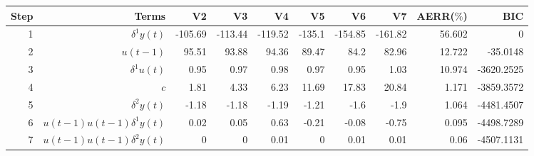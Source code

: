 \begin{tabular}{rrrrrrrrrr}
Step & Terms & V2 & V3 & V4 & V5 & V6 & V7 & AERR($\%$) & BIC \\ 
\hline 
1 & $\delta^1 y(t)$ & -105.69 & -113.44 & -119.52 & -135.1 & -154.85 & -161.82 & 56.602 & 0 \\ 
2 & $u(t-1)$ & 95.51 & 93.88 & 94.36 & 89.47 & 84.2 & 82.96 & 12.722 & -35.0148 \\ 
3 & $\delta^1 u(t)$ & 0.95 & 0.97 & 0.98 & 0.97 & 0.95 & 1.03 & 10.974 & -3620.2525 \\ 
4 & $c$ & 1.81 & 4.33 & 6.23 & 11.69 & 17.83 & 20.84 & 1.171 & -3859.3572 \\ 
5 & $\delta^2 y(t)$ & -1.18 & -1.18 & -1.19 & -1.21 & -1.6 & -1.9 & 1.064 & -4481.4507 \\ 
6 & $u(t-1)u(t-1)\delta^1 y(t)$ & 0.02 & 0.05 & 0.63 & -0.21 & -0.08 & -0.75 & 0.095 & -4498.7289 \\ 
7 & $u(t-1)u(t-1)\delta^2 y(t)$ & 0 & 0 & 0.01 & 0 & 0.01 & 0.01 & 0.06 & -4507.1131 \\ 
\hline 
\end{tabular}